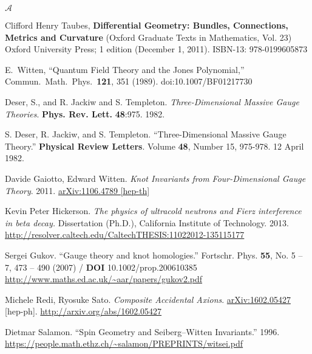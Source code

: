 \documentclass[10pt]{amsart}
\begin{document}
$\mathcal{A}$



\begin{thebibliography}{9}

Clifford Henry Taubes, \textbf{Differential Geometry: Bundles, Connections, Metrics and Curvature} (Oxford Graduate Texts in Mathematics, Vol. 23) Oxford University Press; 1 edition (December 1, 2011). ISBN-13: 978-0199605873


  E.~Witten,
  ``Quantum Field Theory and the Jones Polynomial,''
  Commun.\ Math.\ Phys.\  {\bf 121}, 351 (1989).
  doi:10.1007/BF01217730

  Deser, S., and R. Jackiw and S. Templeton. \emph{Three-Dimensional Massive Gauge Theories}. \textbf{Phys. Rev. Lett.} \textbf{48}:975.  1982.

  S. Deser, R. Jackiw, and S. Templeton.  ``Three-Dimensional Massive Gauge Theory.'' \textbf{Physical Review Letters}. Volume \textbf{48}, Number 15, 975-978.  12 April 1982.  

  
Davide Gaiotto, Edward Witten. \emph{Knot Invariants from Four-Dimensional Gauge Theory}. 2011.   \href{http://arxiv.org/abs/1106.4789}{arXiv:1106.4789 [hep-th]}


Kevin Peter Hickerson.  \emph{The physics of ultracold neutrons and Fierz interference in beta decay.}  Dissertation (Ph.D.), California Institute of Technology. 2013.  \url{http://resolver.caltech.edu/CaltechTHESIS:11022012-135115177}


Sergei Gukov.  ``Gauge theory and knot homologies.''  Fortschr. Phys. \textbf{55}, No. 5 – 7, 473 – 490 (2007) / \textbf{DOI} 10.1002/prop.200610385  \url{http://www.maths.ed.ac.uk/~aar/papers/gukov2.pdf}


Michele Redi, Ryosuke Sato. \emph{Composite Accidental Axions}. \href{arXiv:1602.05427 [hep-ph]}{arXiv:1602.05427} [hep-ph].  \url{http://arxiv.org/abs/1602.05427}




Dietmar Salamon.  ``Spin Geometry and Seiberg–Witten Invariants.''  1996.  \url{https://people.math.ethz.ch/~salamon/PREPRINTS/witsei.pdf}


\end{thebibliography}
\end{document}
